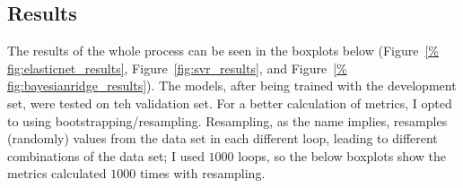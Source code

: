 \documentclass[12pt]{article}
\begin{document}
\subsection{Results}

The results of the whole process can be seen in the boxplots below (Figure~\ref{%
fig:elasticnet_results}, Figure~\ref{fig:svr_results}, and Figure~\ref{%
fig:bayesianridge_results}). The models, after being trained with the development
set, were tested on teh validation set. For a better calculation of metrics, I opted
to using bootstrapping/resampling. Resampling, as the name implies, resamples
(randomly) values from the data set in each different loop, leading to different
combinations of the data set; I used $1000$ loops, so the below boxplots show the
metrics calculated $1000$ times with resampling.
\end{document}
